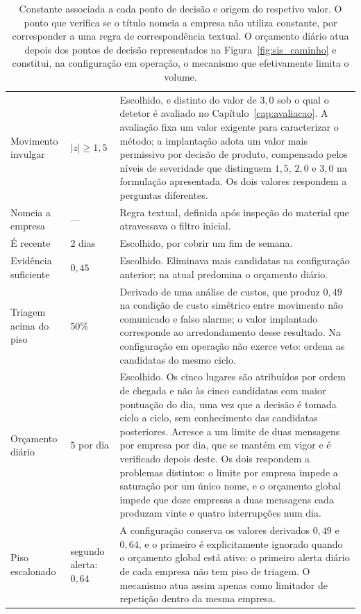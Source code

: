 \begin{table}[!htbp]
\caption[Limiares da política de decisão e a sua proveniência]{Constante associada a cada ponto de
decisão e origem do respetivo valor. O ponto que verifica se o título nomeia a empresa não
utiliza constante, por corresponder a uma regra de correspondência textual. O orçamento diário atua depois dos pontos de decisão
representados na Figura~\ref{fig:sis_caminho} e constitui, na configuração em operação, o
mecanismo que efetivamente limita o volume.}
\label{tab:sis_portas}
\centering
\small
\begin{tabular}{L{0.22\textwidth} L{0.16\textwidth} p{0.50\textwidth}}
\toprule
{} &  &  \\
\midrule
Movimento invulgar & $|z| \geq 1{,}5$ & Escolhido, e distinto do valor de $3{,}0$ sob o qual o
detetor é avaliado no Capítulo~\ref{cap:avaliacao}. A avaliação fixa um valor exigente para
caracterizar o método; a implantação adota um valor mais permissivo por decisão de produto,
compensado pelos níveis de severidade que distinguem $1{,}5$, $2{,}0$ e $3{,}0$ na formulação
apresentada. Os dois valores respondem a perguntas diferentes. \\
Nomeia a empresa & --- & Regra textual, definida após inspeção do material que atravessava o
filtro inicial. \\
É recente & 2 dias & Escolhido, por cobrir um fim de semana. \\
Evidência suficiente & $0{,}45$ & Escolhido. Eliminava mais candidatas na configuração anterior;
na atual predomina o orçamento diário. \\
Triagem acima do piso & $50\%$ & Derivado de uma análise de custos, que produz $0{,}49$ na
condição de custo simétrico entre movimento não comunicado e falso alarme; o valor implantado
corresponde ao arredondamento desse resultado. Na configuração em operação não exerce veto:
ordena as candidatas do mesmo ciclo. \\
Orçamento diário & 5 por dia & Escolhido. Os cinco lugares são atribuídos por ordem de chegada e
não às cinco candidatas com maior pontuação do dia, uma vez que a decisão é tomada ciclo a ciclo,
sem conhecimento das candidatas posteriores. Acresce a um limite de duas mensagens por empresa por
dia, que se mantém em vigor e é verificado depois deste. Os dois respondem a problemas distintos: o
limite por empresa impede a saturação por um único nome, e o orçamento global impede que doze
empresas a duas mensagens cada produzam vinte e quatro interrupções num dia. \\
\addlinespace
Piso escalonado & segundo alerta: $0{,}64$ & A configuração conserva os valores derivados $0{,}49$
e $0{,}64$, e o primeiro é explicitamente ignorado quando o orçamento global está ativo: o
primeiro alerta diário de cada empresa não tem piso de triagem. O mecanismo atua assim apenas
como limitador de repetição dentro da mesma empresa. \\
\bottomrule
\end{tabular}
\end{table}

